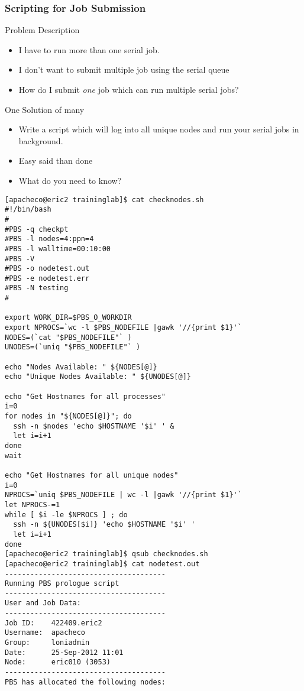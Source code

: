 \documentclass[slidestop,mathserif,compress,xcolor=svgnames]{beamer}
\newenvironment{bblock}[0]
{
\begin{beamerboxesrounded}[upper=uppercol1,lower=lowercol1,shadow=true]}
{\end{beamerboxesrounded}}
\newenvironment{eblock}[0]
{
\begin{beamerboxesrounded}[upper=uppercol2,lower=lowercol2,shadow=true]}
{\end{beamerboxesrounded}}
\begin{document}
\begin{frame}
  \frametitle{\small Scripting for Job Submission}
  \begin{bblock}{Problem Description}
    \begin{itemize}
      \item I have to run more than one serial job.
      \item I don't want to submit multiple job using the serial queue
      \item How do I submit \emph{one} job which can run multiple serial jobs?
    \end{itemize}
  \end{bblock}
  \begin{eblock}{One Solution of many}
    \begin{itemize}
      \item Write a script which will log into all unique nodes and run your serial jobs in background.
      \item Easy said than done
      \item What do you need to know?
      \begin{enumerate}
        \fontsize{8}{7}
      \end{enumerate}
    \end{itemize}
  \end{eblock}
  \framebreak
  \begin{lstlisting}
[apacheco@eric2 traininglab]$ cat checknodes.sh 
#!/bin/bash
#
#PBS -q checkpt
#PBS -l nodes=4:ppn=4
#PBS -l walltime=00:10:00
#PBS -V
#PBS -o nodetest.out
#PBS -e nodetest.err
#PBS -N testing
#

export WORK_DIR=$PBS_O_WORKDIR
export NPROCS=`wc -l $PBS_NODEFILE |gawk '//{print $1}'`
NODES=(`cat "$PBS_NODEFILE"` )
UNODES=(`uniq "$PBS_NODEFILE"` )

echo "Nodes Available: " ${NODES[@]}
echo "Unique Nodes Available: " ${UNODES[@]}

echo "Get Hostnames for all processes"
i=0
for nodes in "${NODES[@]}"; do
  ssh -n $nodes 'echo $HOSTNAME '$i' ' &
  let i=i+1
done
wait

echo "Get Hostnames for all unique nodes"
i=0
NPROCS=`uniq $PBS_NODEFILE | wc -l |gawk '//{print $1}'`
let NPROCS-=1
while [ $i -le $NPROCS ] ; do
  ssh -n ${UNODES[$i]} 'echo $HOSTNAME '$i' '
  let i=i+1
done
[apacheco@eric2 traininglab]$ qsub checknodes.sh 
[apacheco@eric2 traininglab]$ cat nodetest.out 
--------------------------------------
Running PBS prologue script
--------------------------------------
User and Job Data:
--------------------------------------
Job ID:    422409.eric2
Username:  apacheco
Group:     loniadmin
Date:      25-Sep-2012 11:01
Node:      eric010 (3053)
--------------------------------------
PBS has allocated the following nodes:


\end{lstlisting}
\end{frame}
\end{document}

